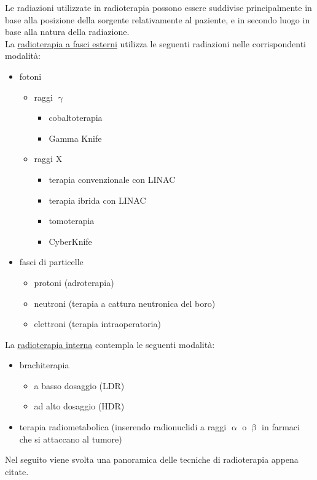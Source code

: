 \documentclass{report}
\numberwithin{equation}{section}
\numberwithin{figure}{section}
\begin{document}
Le radiazioni utilizzate in radioterapia possono essere suddivise principalmente in base alla posizione della sorgente relativamente al paziente, e in secondo luogo in base alla natura della radiazione.\\
La \underline{radioterapia a fasci esterni} utilizza le seguenti radiazioni nelle corrispondenti modalità:
\begin{itemize}[label=$-$]
    \item fotoni
    \begin{itemize}[label=$\triangleright$]
        \item raggi $\upgamma$
        \begin{itemize}[label=$\diamond$]
            \item cobaltoterapia
            \item Gamma Knife
        \end{itemize}
        \item raggi X
        \begin{itemize}[label=$\diamond$]
            \item terapia convenzionale con LINAC
            \item terapia ibrida con LINAC
            \item tomoterapia
            \item CyberKnife
        \end{itemize}
    \end{itemize}
    \item fasci di particelle
    \begin{itemize}[label=$\triangleright$]
        \item protoni (adroterapia)
        \item neutroni (terapia a cattura neutronica del boro)
        \item elettroni (terapia intraoperatoria)
    \end{itemize}
\end{itemize}
La \underline{radioterapia interna} contempla le seguenti modalità:
\begin{itemize}[label=$-$]
    \item brachiterapia
    \begin{itemize}[label=$\triangleright$]
        \item a basso dosaggio (LDR)
        \item ad alto dosaggio (HDR)
    \end{itemize}
    \item terapia radiometabolica (inserendo radionuclidi a raggi $\upalpha$ o $\upbeta$ in farmaci che si attaccano al tumore)
\end{itemize}
Nel seguito viene svolta una panoramica delle tecniche di radioterapia appena citate.
\end{document}
